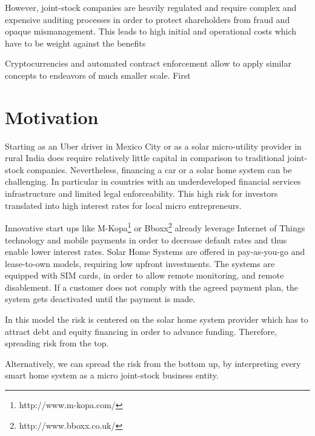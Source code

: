 However, joint-stock companies are heavily regulated and require complex and expensive auditing processes in order to protect shareholders from fraud and opaque mismanagement. This leads to high initial and operational costs which have to be weight against the benefits

Cryptocurrencies and automated contract enforcement allow to apply similar concepts to endeavors of much smaller scale. First 
\section{Motivation}

Starting as an Uber driver in Mexico City or as a solar micro-utility provider in rural India does require relatively little capital in comparison to traditional joint-stock companies. 
Nevertheless, financing a car or a solar home system can be challenging. In particular in countries with an underdeveloped financial services infrastructure and limited legal enforceability. This high risk for investors translated into high interest rates for local micro entrepreneurs. 

Innovative start ups like M-Kopa\footnote{http://www.m-kopa.com/} or Bboxx\footnote{http://www.bboxx.co.uk/} already leverage Internet of Things technology and mobile payments in order to decrease default rates and thus enable lower interest rates. Solar Home Systems are offered in pay-as-you-go and lease-to-own models, requiring low upfront investments. The systems are equipped with SIM cards, in order to allow remote monitoring, and remote disablement. If a customer does not comply with the agreed payment plan, the system gets deactivated until the payment is made. 

In this model the risk is centered on the solar home system provider which has to attract debt and equity financing in order to advance funding. Therefore, spreading risk from the top.

Alternatively, we can spread the risk from the bottom up, by interpreting every smart home system as a micro joint-stock business entity.



